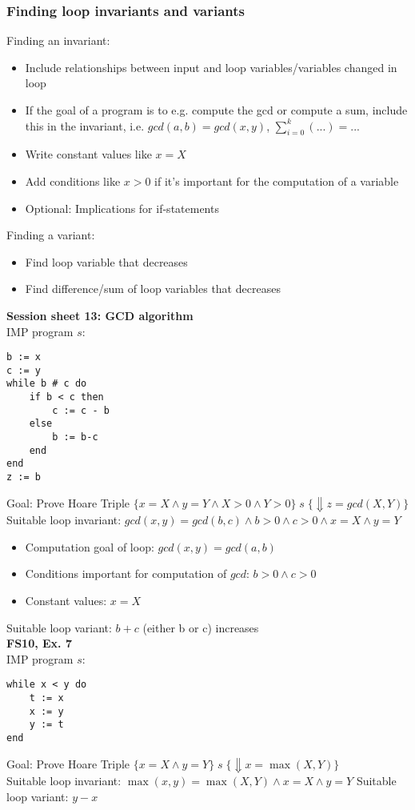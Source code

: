 \documentclass{article}
\begin{document}
\subsubsection{Finding loop invariants and variants}
Finding an invariant: \begin{itemize}
    \item Include relationships between input and loop variables/variables changed in loop
    \item If the goal of a program is to e.g. compute the gcd or compute a sum, include
          this in the invariant, i.e. $gcd(a,b)=gcd(x,y)$, $\sum_{i=0}^{k}(...)=...$
    \item Write constant values like $x=X$
    \item Add conditions like $x>0$ if it's important for the computation of a variable
    \item Optional: Implications for if-statements
\end{itemize}
Finding a variant:
\begin{itemize}
    \item Find loop variable that decreases
    \item Find difference/sum of loop variables that decreases
\end{itemize}
\smallskip
\textbf{Session sheet 13: GCD algorithm} \\
IMP program $s$:
\begin{verbatim}
b := x
c := y
while b # c do
    if b < c then
        c := c - b
    else
        b := b-c
    end
end
z := b
\end{verbatim}
Goal: Prove Hoare Triple
$\{x=X \land y=Y\land X > 0 \land Y >0\} \; s \; \{\Downarrow z=gcd(X,Y)\}$ \\
Suitable loop invariant: $gcd(x,y)=gcd(b,c) \land b >0 \land c > 0 \land x=X \land y=Y$
\begin{itemize}
    \item Computation goal of loop: $gcd(x,y) = gcd(a,b)$
    \item Conditions important for computation of $gcd$: $b>0 \land c > 0$
    \item Constant values: $x=X$
\end{itemize}
Suitable loop variant: $b+c$ (either b or c) increases
\smallskip \\
\textbf{FS10, Ex. 7} \\
IMP program $s$:
\begin{verbatim}
while x < y do
    t := x
    x := y
    y := t
end
\end{verbatim}
Goal: Prove Hoare Triple $\{x=X \land y=Y\} \; s \; \{\Downarrow x = \max(X,Y)\}$ \\
Suitable loop invariant: $\max(x,y)=\max(X,Y) \land x=X \land y=Y$
Suitable loop variant: $y-x$
\end{document}
